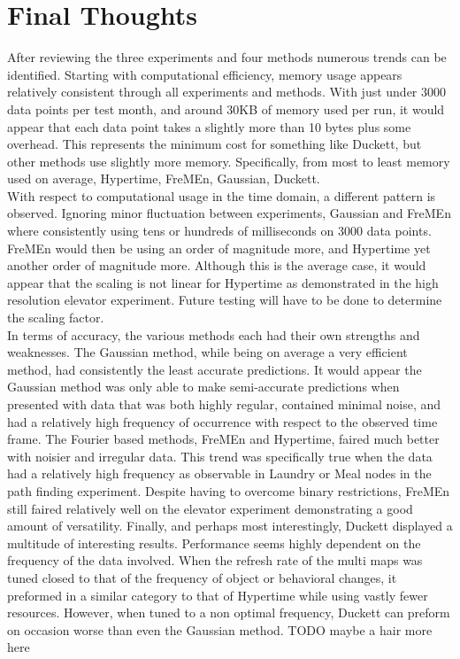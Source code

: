 \section{ Final Thoughts }

After reviewing the three experiments and four methods numerous trends can be
identified. Starting with computational efficiency, memory usage appears
relatively consistent through all experiments and methods. With just under 3000
data points per test month, and around 30KB of memory used per run,
it would appear that each data point takes a slightly more than 10 bytes plus
some overhead. This represents the minimum cost for something like Duckett, but
other methods use slightly more memory. Specifically, from most to least memory
used on average, Hypertime, FreMEn, Gaussian, Duckett. \\

With respect to computational usage in the time domain, a different pattern is
observed. Ignoring minor fluctuation between experiments, Gaussian and FreMEn
where consistently using tens or hundreds of milliseconds on 3000 data points.
FreMEn would then be using an order of magnitude more, and Hypertime yet another
order of magnitude more. Although this is the average case, it would appear that
the scaling is not linear for Hypertime as demonstrated in the high resolution
elevator experiment. Future testing will have to be done to determine the
scaling factor. \\

In terms of accuracy, the various methods each had their own strengths and
weaknesses. The Gaussian method, while being on average a very efficient
method, had consistently the least accurate predictions. It would appear the
Gaussian method was only able to make semi-accurate predictions when presented
with data that was both highly regular, contained minimal noise, and had a
relatively high frequency of occurrence with respect to the observed time
frame. The Fourier based methods, FreMEn and Hypertime, faired much better
with noisier and irregular data. This trend was specifically true when the data
had a relatively high frequency as observable in Laundry or Meal nodes in the
path finding experiment. Despite having to overcome binary restrictions, FreMEn
still faired relatively well on the elevator experiment demonstrating a good
amount of versatility. Finally, and perhaps most interestingly, Duckett
displayed a multitude of interesting results. Performance seems highly dependent
on the frequency of the data involved. When the refresh rate of the multi maps
was tuned closed to that of the frequency of object or behavioral changes, it
preformed in a similar category to that of Hypertime while using vastly fewer
resources. However, when tuned to a non optimal frequency, Duckett can preform
on occasion worse than even the Gaussian method. TODO maybe a hair more here


